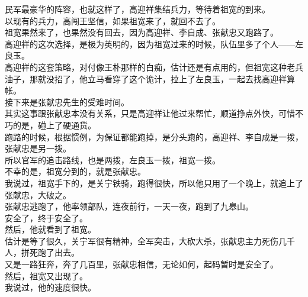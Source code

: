 \begin{multicols}{\theparacolNo}
民军最豪华的阵容，也就这样了，高迎祥集结兵力，等待着祖宽的到来。\\

以现有的兵力，高闯王坚信，如果祖宽来了，就回不去了。\\

祖宽果然来了，也果然没有回去，因为高迎祥、李自成、张献忠又跑路了。\\

高迎祥的这次选择，是极为英明的，因为祖宽过来的时候，队伍里多了个人——左良玉。\\

高迎祥的这套策略，对付像王朴那样的白痴，估计还是有点用的，但祖宽这种老兵油子，那就没招了，他立马看穿了这个诡计，拉上了左良玉，一起去找高迎祥算帐。\\

接下来是张献忠先生的受难时间。\\

其实这事跟张献忠本没有关系，只是高迎祥让他过来帮忙，顺道挣点外快，可惜不巧的是，碰上了硬通货。\\

跑路的时候，根据惯例，为保证都能跑掉，是分头跑的，高迎祥、李自成是一拨，张献忠是另一拨。\\

所以官军的追击路线，也是两拨，左良玉一拨，祖宽一拨。\\

不幸的是，祖宽分到的，就是张献忠。\\

我说过，祖宽手下的，是关宁铁骑，跑得很快，所以他只用了一个晚上，就追上了张献忠，大破之。\\

张献忠逃跑了，他率领部队，连夜前行，一天一夜，跑到了九皋山。\\

安全了，终于安全了。\\

然后，他就看到了祖宽。\\

估计是等了很久，关宁军很有精神，全军突击，大砍大杀，张献忠主力死伤几千人，拼死跑了出去。\\

又是一路狂奔，奔了几百里，张献忠相信，无论如何，起码暂时是安全了。\\

然后，祖宽又出现了。\\

我说过，他的速度很快。\\


\end{multicols}
